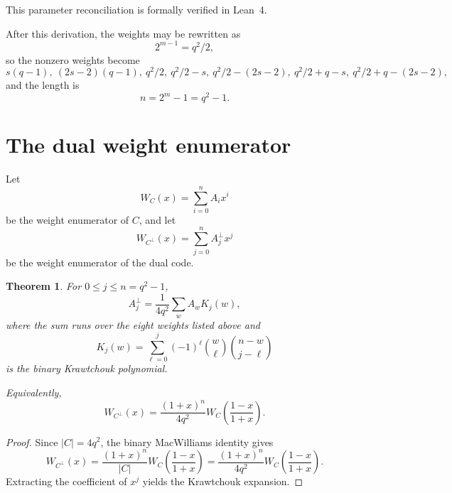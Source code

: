 \documentclass[11pt]{article}
\newtheorem{theorem}{Theorem}
\begin{document}
This parameter reconciliation is formally verified in Lean~4.

After this derivation, the weights may be rewritten as
\begin{equation}
2^{m-1}=q^2/2,
\end{equation}
so the nonzero weights become
\begin{equation}
s(q-1),\ (2s-2)(q-1),\ q^2/2,\ q^2/2-s,\ q^2/2-(2s-2),\ q^2/2+q-s,\ q^2/2+q-(2s-2),
\end{equation}
and the length is
\begin{equation}
n=2^m-1=q^2-1.
\end{equation}

\section{The dual weight enumerator}

Let
\begin{equation}
W_C(x)=\sum_{i=0}^{n}A_i x^i
\end{equation}
be the weight enumerator of $C$, and let
\begin{equation}
W_{C^{\perp}}(x)=\sum_{j=0}^{n}A_j^{\perp}x^j
\end{equation}
be the weight enumerator of the dual code.

\begin{theorem}
For $0\le j\le n=q^2-1$,
\begin{equation}
A_j^{\perp}=\frac1{4q^2}\sum_{w} A_w K_j(w),
\end{equation}
where the sum runs over the eight weights listed above and
\begin{equation}
K_j(w)=\sum_{\ell=0}^{j}(-1)^{\ell}\binom{w}{\ell}\binom{n-w}{j-\ell}
\end{equation}
is the binary Krawtchouk polynomial.

Equivalently,
\begin{equation}
W_{C^{\perp}}(x)=\frac{(1+x)^n}{4q^2}W_C\!\left(\frac{1-x}{1+x}\right).
\end{equation}
\end{theorem}

\begin{proof}
Since $|C|=4q^2$, the binary MacWilliams identity gives
\begin{equation}
W_{C^{\perp}}(x)=\frac{(1+x)^n}{|C|}W_C\!\left(\frac{1-x}{1+x}\right)
=\frac{(1+x)^n}{4q^2}W_C\!\left(\frac{1-x}{1+x}\right).
\end{equation}
Extracting the coefficient of $x^j$ yields the Krawtchouk expansion.
\end{proof}
\end{document}
